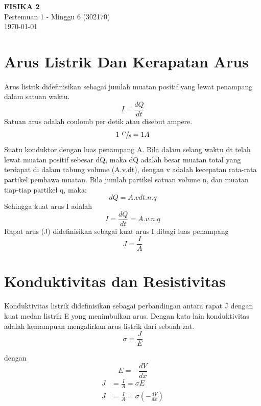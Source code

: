 \documentclass[twocolumn, 11pt]{article}%
\begin{document}
\begin{strip}
  \vspace*{\dimexpr-\stripsep}
  \begin{center}
      \Large\textbf{FISIKA 2}\\
      \large{Pertemuan 1 - Minggu 6 (302170)}\\
      \large{\today}
   \end{center}
\end{strip}

\section{Arus Listrik Dan Kerapatan Arus}
    \paragraph{} Arus listrik didefinisikan sebagai jumlah muatan positif yang lewat penampang dalam satuan waktu.
    \[ I=\frac{dQ}{dt} \]
    Satuan arus adalah coulomb per detik atau disebut ampere.
    \[ 1\ \sfrac{C}{s} = 1 A \]
    Suatu konduktor dengan luas penampang A. Bila dalam selang waktu dt telah lewat muatan positif sebesar dQ, maka dQ adalah besar muatan total yang terdapat di dalam tabung volume (A.v.dt), dengan v adalah kecepatan rata-rata partikel pembawa muatan. Bila jumlah partikel satuan volume n, dan muatan tiap-tiap partikel q, maka:
    \[ dQ=A.vdt.n.q \]
    Sehingga kuat arus I adalah
    \[ I=\frac{dQ}{dt}=A.v.n.q \]
    Rapat arus (J) didefinisikan sebagai kuat arus I dibagi luas penampang
    \[J=\frac{I}A\]

    \section{Konduktivitas dan Resistivitas}%
    \paragraph{} Konduktivitas listrik didefinisikan sebagai perbandingan antara rapat J dengan kuat medan listrik E yang menimbulkan arus. Dengan kata lain konduktivitas adalah kemampuan mengalirkan arus listrik dari sebuah zat.
    \[\sigma = \frac{J}E \]

    dengan
    \[ E=-\frac{dV}{dx} \]
    \begin{align*}
    J&=\frac{I}A =\sigma E\\
    J&=\frac{I}A =\sigma \left(-\frac{dV}{dx}\right)\\
    \end{align*}
\end{document}
